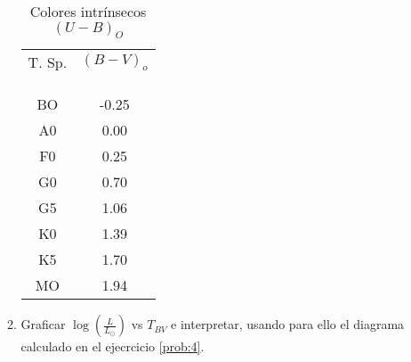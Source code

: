 \documentclass[12pt,spanish,a4paper]{practice}
\begin{document}
\begin{enumerate}[wide, labelwidth=!, labelindent=0pt, label=\textbf{\arabic*)}, ref=\arabic*]
\begin{enumerate}[label=\alph*., ref=\theenumi\alph*]
                    \begin{table}[h!]
                        \centering
                        \begin{tabular}{c | c}
                            T. Sp.  & $\left(B-V\right)_{o}$ \\\\
                              &  \\[-0.8em]\hline
                              &  \\[-0.8em]
                            BO & -0.25 \\
                            A0 &  0.00 \\
                            F0 &  0.25 \\
                            G0 &  0.70 \\
                            G5 &  1.06 \\
                            K0 &  1.39 \\
                            K5 &  1.70 \\
                            MO &  1.94 \\
                            \hline
                        \end{tabular}
                        \caption{
                            Colores intrínsecos $\left(U-B\right)_O$
                        }\label{table:3}
                    \end{table}

                \item \label{prob:14:B} Graficar $\log\left(\frac{L}{L_\odot}\right)$ vs $T_{BV}$ e interpretar, usando para ello el diagrama calculado en el ejecrcicio \ref{prob:4}.
            \end{enumerate}
    \end{enumerate}
\end{document}
